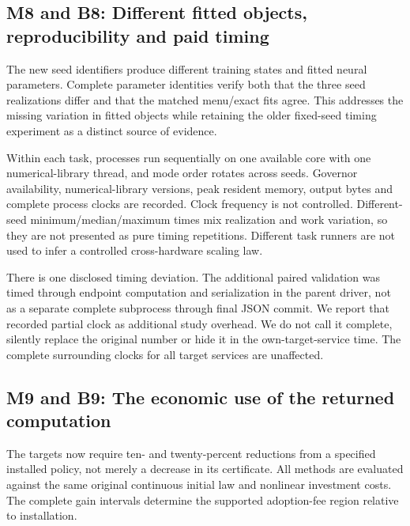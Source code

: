 \documentclass[ecta,nameyear,draft]{econsocart}
\begin{document}
\hypertarget{m8-and-b8-different-fitted-objects-reproducibility-and-paid-timing}{%
\subsection{M8 and B8: Different fitted objects, reproducibility and
paid
timing}\label{m8-and-b8-different-fitted-objects-reproducibility-and-paid-timing}}

The new seed identifiers produce different training states and fitted
neural parameters. Complete parameter identities verify both that the
three seed realizations differ and that the matched menu/exact fits
agree. This addresses the missing variation in fitted objects while
retaining the older fixed-seed timing experiment as a distinct source of
evidence.

Within each task, processes run sequentially on one available core with
one numerical-library thread, and mode order rotates across seeds.
Governor availability, numerical-library versions, peak resident memory,
output bytes and complete process clocks are recorded. Clock frequency
is not controlled. Different-seed minimum/median/maximum times mix
realization and work variation, so they are not presented as pure timing
repetitions. Different task runners are not used to infer a controlled
cross-hardware scaling law.

There is one disclosed timing deviation. The additional paired
validation was timed through endpoint computation and serialization in
the parent driver, not as a separate complete subprocess through final
JSON commit. We report that recorded partial clock as additional study
overhead. We do not call it complete, silently replace the original
number or hide it in the own-target-service time. The complete
surrounding clocks for all target services are unaffected.

\hypertarget{m9-and-b9-the-economic-use-of-the-returned-computation}{%
\subsection{M9 and B9: The economic use of the returned
computation}\label{m9-and-b9-the-economic-use-of-the-returned-computation}}

The targets now require ten- and twenty-percent reductions from a
specified installed policy, not merely a decrease in its certificate.
All methods are evaluated against the same original continuous initial
law and nonlinear investment costs. The complete gain intervals
determine the supported adoption-fee region relative to installation.
\end{document}
